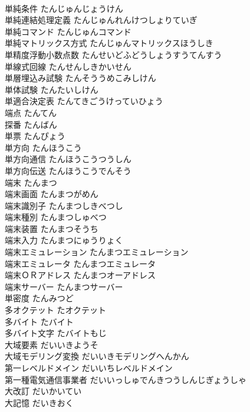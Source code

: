 \documentclass[8pt]{extreport}
\begin{document}
\begin{CJK}{UTF8}{min}
\\	単純条件	たんじゅんじょうけん	
\\	単純連結処理定義	たんじゅんれんけつしょりていぎ	
\\	単純コマンド	たんじゅんコマンド	
\\	単純マトリックス方式	たんじゅんマトリックスほうしき	
\\	単精度浮動小数点数	たんせいどふどうしょうすうてんすう	
\\	単線式回線	たんせんしきかいせん	
\\	単層埋込み試験	たんそううめこみしけん	
\\	単体試験	たんたいしけん	
\\	単適合決定表	たんてきごうけっていひょう	
\\	端点	たんてん	
\\	探番	たんばん	
\\	単票	たんぴょう	
\\	単方向	たんほうこう	
\\	単方向通信	たんほうこうつうしん	
\\	単方向伝送	たんほうこうでんそう	
\\	端末	たんまつ	
\\	端末画面	たんまつがめん	
\\	端末識別子	たんまつしきべつし	
\\	端末種別	たんまつしゅべつ	
\\	端末装置	たんまつそうち	
\\	端末入力	たんまつにゅうりょく	
\\	端末エミュレーション	たんまつエミュレーション	
\\	端末エミュレータ	たんまつエミュレータ	
\\	端末ＯＲアドレス	たんまつオーアドレス	
\\	端末サーバー	たんまつサーバー	
\\	単密度	たんみつど	
\\	多オクテット	たオクテット	
\\	多バイト	たバイト	
\\	多バイト文字	たバイトもじ	
\\	大域要素	だいいきようそ	
\\	大域モデリング変換	だいいきモデリングへんかん	
\\	第一レベルドメイン	だいいちレベルドメイン	
\\	第一種電気通信事業者	だいいっしゅでんきつうしんじぎょうしゃ	
\\	大改訂	だいかいてい	
\\	大記憶	だいきおく	

\end{CJK}
\end{document}
